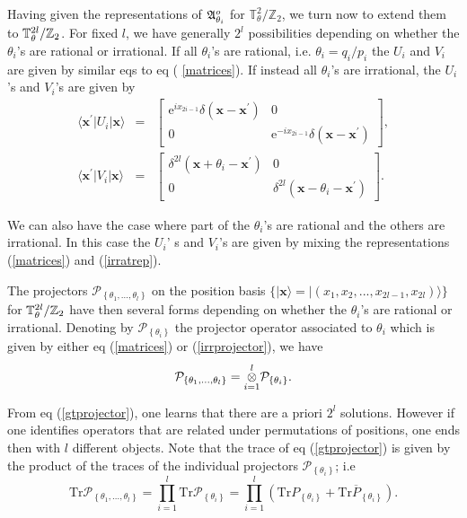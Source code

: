 \documentclass[a4paper,12pt]{article}
\begin{document}
Having given the representations of $\frak{A}^{o}_{\theta _{i}}$ for $\mathbb{T}%
_{\theta }^{2}/\mathbb{Z}_{2}$, we turn now to extend them to $\mathbb{T}_{%
\mathbf{\theta }}^{2l}/\mathbb{Z}_{2}$. For fixed $l$, we have generally $%
2^{l}$ possibilities depending on whether the $\theta _{i}$'s are rational
or irrational. If all $\theta _{i}$'s are rational, i.e. $\theta
_{i}=q_{i}/p_{i}$ the $U_{i}$ and $V_{i}$ are given by similar eqs to eq (%
\ref{matrices}). If instead all $\theta _{i}$'s are irrational, the $U_{i}$%
's and $V_{i}$'s are given by
\begin{eqnarray}
\langle \mathbf{x}^{\prime }|U_{i}|\mathbf{x}\rangle &=&\left[
\begin{array}{cc}
\text{e}^{ix_{2i-1}}\delta \left( \mathbf{x-x}^{\prime }\right) & 0 \\
0 & \text{e}^{-ix_{2i-1}}\delta \left( \mathbf{x-x}^{\prime }\right)
\end{array}
\right] , \\
\langle \mathbf{x}^{\prime }|V_{i}|\mathbf{x}\rangle &=&\left[
\begin{array}{cc}
\delta ^{2l}\left( \mathbf{x}+\theta _{i}-\mathbf{x}^{\prime }\right) & 0 \\
0 & \delta ^{2l}\left( \mathbf{x}-\theta _{i}-\mathbf{x}^{\prime }\right)
\end{array}
\right] .
\end{eqnarray}

We can also have the case where part of the $\theta _{i}$'s are rational and
the others are irrational. In this case the $U_{i}$' s and $V_{i}$'s are
given by mixing the representations (\ref{matrices}) and (\ref{irratrep}).

The projectors $\mathcal{P}_{\left\{ \theta _{1},\ldots ,\theta _{l}\right\}
}$ on the position basis $\{|\mathbf{x}\rangle
=|(x_{1},x_{2},...,x_{2l-1},x_{2l})\rangle \}$ for $\mathbb{T}_{\mathbf{%
\theta }}^{2l}/\mathbb{Z}_{2}$ have then several forms depending on whether the $%
\theta _{i}$'s are rational or irrational. Denoting by $\mathcal{P}_{\left\{
\theta _{i}\right\} }$ the projector operator associated to $\theta _{i}$
which is given by either eq (\ref{matrices}) or (\ref{irrprojector}), we
have
\begin{equation}
\mathcal{P}_{\left\{ \theta _{1},\ldots ,\theta _{l}\right\} }=\overset{l}{%
\underset{i=1}{\otimes }}\mathcal{P}_{\left\{ \theta _{i}\right\} }.
\label{gtprojector}
\end{equation}

From eq (\ref{gtprojector}), one learns that there are a priori
$2^{l}$ solutions. However if one identifies operators that are
related under permutations of positions, one ends then with $l$
different objects. Note that the trace of eq (\ref{gtprojector})
is given by the product of the traces of the individual projectors
$\mathcal{P}_{\left\{\theta _{i}\right\}}$; i.e
\begin{equation}
\text{Tr}\mathcal{P}_{\left\{ \theta _{1},\ldots ,\theta
_{l}\right\} }=\prod_{i=1}^{l}\text{Tr}\mathcal{P}_{\left\{ \theta
_{i}\right\} }=\prod_{i=1}^{l}(\text{Tr}P_{\left\{ \theta
_{i}\right\} }+\text{Tr}\overline{P}_{\left\{ \theta _{i}\right\}
}). \label{traceproj}
\end{equation}
\end{document}
